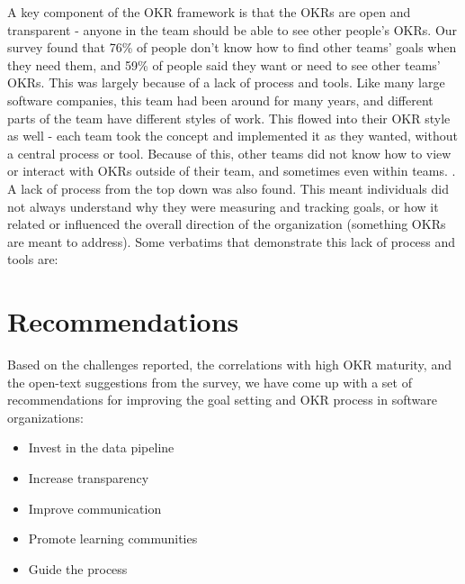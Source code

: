 \documentclass[sigconf, nonacm]{acmart}
\begin{document}
A key component of the OKR framework is that the OKRs are open and transparent - anyone in the team should be able to see other people's OKRs. Our survey found that 76\% of people don't know how to find other teams' goals when they need them, and 59\% of people said they want or need to see other teams' OKRs. This was largely because of a lack of process and tools. Like many large software companies, this team had been around for many years, and different parts of the team have different styles of work. This flowed into their OKR style as well - each team took the concept and implemented it as they wanted, without a central process or tool. Because of this, other teams did not know how to view or interact with OKRs outside of their team, and sometimes even within teams. . A lack of process from the top down was also found. This meant individuals did not always understand why they were measuring and tracking goals, or how it related or influenced the overall direction of the organization (something OKRs are meant to address). Some verbatims that demonstrate this lack of process and tools are:





\section{Recommendations}
\label{sec:rec}

Based on the challenges reported, the correlations with high OKR maturity, and the open-text suggestions from the survey, we have come up with a set of recommendations for improving the goal setting and OKR process in software organizations:
\begin{itemize}
    \item Invest in the data pipeline
    \item Increase transparency
    \item Improve communication
    \item Promote learning communities 
    \item Guide the process
\end{itemize}
\end{document}
